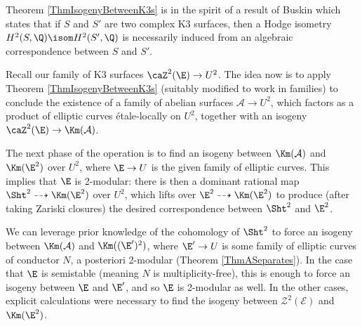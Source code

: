 \documentclass{article}
\newcommand{\jared}[1]{\textcolor{red}{#1}}
\begin{document}
\begin{rmk}  Theorem \ref{ThmIsogenyBetweenK3s} is in the spirit of a result of Buskin \cite[Theorem 1.1]{Buskin} which states that if $S$ and $S'$ are two complex K3 surfaces, then a Hodge isometry $H^2(S,\Q)\isom H^2(S',\Q)$ is necessarily induced from an algebraic correspondence between $S$ and $S'$.   
\end{rmk}


Recall our family of K3 surfaces $\caZ^2(\E)\to U^2$.  The idea now is to apply Theorem \ref{ThmIsogenyBetweenK3s} (suitably modified to work in families) to conclude the existence of a family of abelian surfaces $\mathcal{A}\to U^2$, which factors as a product of elliptic curves \'etale-locally on $U^2$, together with an isogeny $\caZ^2(\E)\to \Km(\mathcal{A})$.  

The next phase of the operation is to find an isogeny between $\Km(\mathcal{A})$ and $\Km(\E^2)$ over $U^2$, where $\E\to U$ is the given family of elliptic curves.  This implies that $\E$ is 2-modular:  there is then a dominant rational map $\Sht^2\dashrightarrow \Km(\E^2)$ over $U^2$, which lifts over $\E^2\dashrightarrow \Km(\E^2)$ to produce (after taking Zariski closures) the desired correspondence between $\Sht^2$ and $\E^2$.  

We can leverage prior knowledge of the cohomology of $\Sht^2$ to force an isogeny between $\Km(\mathcal{A})$ and $\Km((\E')^2)$, where $\E'\to U$ is some family of elliptic curves of conductor $N$, a posteriori 2-modular (Theorem \ref{ThmASeparates}).  In the case that $\E$ is semistable (meaning $N$ is multiplicity-free), this is enough to force an isogeny between $\E$ and $\E'$, and so $\E$ is 2-modular as well.  In the other cases, explicit calculations were necessary to find the isogeny between $\mathcal{Z}^2(\mathcal{E})$ and $\Km(\E^2)$.  
\end{document}

